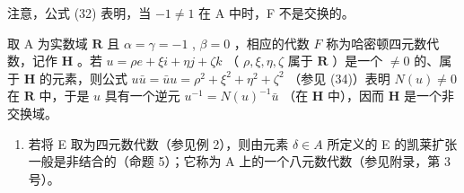 注意，公式 (32) 表明，当 \(-1 \neq 1\) 在 A 中时，F 不是交换的。

取 A 为实数域 \(\mathbf{R}\) 且 \(\alpha = \gamma = -1\) , \(\beta = 0\) ，相应的代数 \(F\) 称为哈密顿四元数代数，记作 \(\mathbf{H}\) 。若 \(u = \rho e + \xi i + \eta j + \zeta k\) （ \(\rho, \xi, \eta, \zeta\) 属于 \(\mathbf{R}\) ）是一个 \(\neq 0\) 的、属于 \(\mathbf{H}\) 的元素，则公式 \(u\bar{u} = \bar{u} u = \rho^2 + \xi^2 + \eta^2 + \zeta^2\) （参见 (34)）表明 \(N(u) \neq 0\) 在 \(\mathbf{R}\) 中，于是 \(u\) 具有一个逆元 \(u^{-1} = N(u)^{-1}\bar{u}\) （在 \(\mathbf{H}\) 中），因而 \(\mathbf{H}\) 是一个非交换域。

\begin{enumerate}
\def\labelenumi{(\arabic{enumi})}
\setcounter{enumi}{2}
\tightlist
\item
  若将 E 取为四元数代数（参见例 2），则由元素 \(\delta \in A\) 所定义的 E 的凯莱扩张一般是非结合的（命题 5）；它称为 A 上的一个八元数代数（参见附录，第 3 号）。
\end{enumerate}

